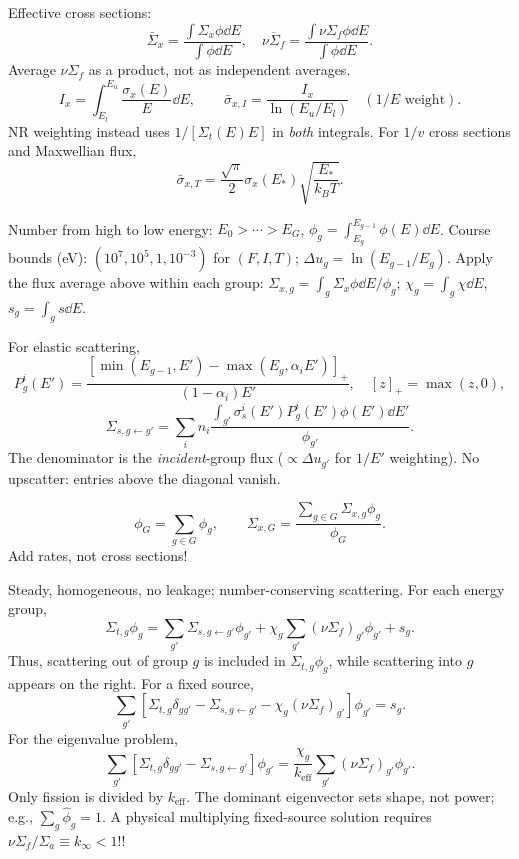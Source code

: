 \begin{handoutcolumns}
\switchcolumn\RaggedRight
Effective cross sections:
\[
 \bar\Sigma_x=\frac{\int\Sigma_x\phi\dd E}{\int\phi\dd E},\quad
 \overline{\nu\Sigma_f}=\frac{\int\nu\Sigma_f\phi\dd E}{\int\phi\dd E}.
\]
Average $\nu\Sigma_f$ as a product, not as independent averages.
\[
 I_x=\int_{E_l}^{E_u}\frac{\sigma_x(E)}{E}\dd E,\qquad
 \bar\sigma_{x,I}=\frac{I_x}{\ln(E_u/E_l)}\quad(1/E\text{ weight}).
\]
NR weighting instead uses $1/[\Sigma_t(E)E]$ in \emph{both} integrals.
For $1/v$ cross sections and Maxwellian flux,
\[
 \bar\sigma_{x,T}=\frac{\sqrt\pi}{2}\sigma_x(E_*)
 \sqrt{\frac{E_*}{k_BT}}.
\]


Number from high to low energy: $E_0>\cdots>E_G$,
$\phi_g=\int_{E_g}^{E_{g-1}}\phi(E)\dd E$.
Course bounds (eV): $(10^7,10^5,1,10^{-3})$ for $(F,I,T)$;
$\Delta u_g=\ln(E_{g-1}/E_g)$.
Apply the flux average above within each group:
$\Sigma_{x,g}=\int_g\Sigma_x\phi\dd E/\phi_g$;
$\chi_g=\int_g\chi\dd E$, $s_g=\int_gs\dd E$.

\vspace{0.25cm}

 For elastic scattering,
\[
 P_g^i(E')=\frac{[\min(E_{g-1},E')-\max(E_g,\alpha_i E')]_+}
                  {(1-\alpha_i)E'},\quad[z]_+=\max(z,0),
\]
\[
 \Sigma_{s,g\gets g'}=\sum_i n_i
 \frac{\int_{g'}\sigma_s^i(E')P_g^i(E')\phi(E')\dd E'}{\phi_{g'}}.
\]
The denominator is the \emph{incident}-group flux ($\propto\Delta u_{g'}$
for $1/E'$ weighting). No upscatter: entries above the diagonal vanish.

\[
 \phi_G=\sum_{g\in G}\phi_g,\qquad
 \Sigma_{x,G}=\frac{\sum_{g\in G}\Sigma_{x,g}\phi_g}{\phi_G}.
\]
Add rates, not cross sections!



Steady, homogeneous, no leakage; number-conserving scattering.
For each energy group,
\[
 \Sigma_{t,g}\phi_g
 =
 \sum_{g'}\Sigma_{s,g\gets g'}\phi_{g'}
 +\chi_g\sum_{g'}(\nu\Sigma_f)_{g'}\phi_{g'}
 +s_g .
\]
Thus, scattering out of group $g$ is included in $\Sigma_{t,g}\phi_g$,
while scattering into $g$ appears on the right.
For a fixed source,
\[
 \sum_{g'}
 \left[
   \Sigma_{t,g}\delta_{gg'}
   -\Sigma_{s,g\gets g'}
   -\chi_g(\nu\Sigma_f)_{g'}
 \right]\phi_{g'}
 =s_g .
\]
For the eigenvalue problem,
\[
 \sum_{g'}
 \left[
   \Sigma_{t,g}\delta_{gg'}
   -\Sigma_{s,g\gets g'}
 \right]\phi_{g'}
 =
 \frac{\chi_g}{k_{\text{eff}}}
 \sum_{g'}(\nu\Sigma_f)_{g'}\phi_{g'} .
\]
Only fission is divided by $k_{\text{eff}}$. The dominant eigenvector
sets shape, not power; e.g., $\sum_g\widehat{\phi}_g=1$.
A physical multiplying fixed-source solution requires $\nu\Sigma_f/\Sigma_a \equiv k_\infty<1$!!


\end{handoutcolumns}
